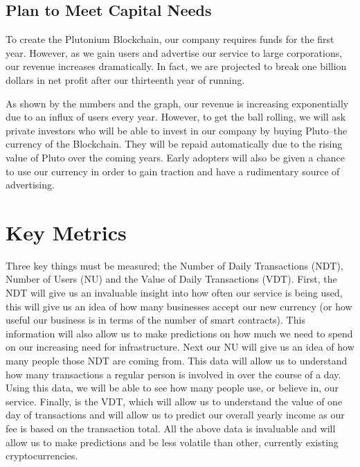 \documentclass[12pt]{article}
\begin{document}
\subsection{Plan to Meet Capital Needs}
To create the Plutonium Blockchain, our company requires funds for the first year. However, as we gain users and advertise our service to large corporations, our revenue increases dramatically. In fact, we are projected to break one billion dollars in net profit after our thirteenth year of running.

As shown by the numbers and the graph, our revenue is increasing exponentially due to an influx of users every year. However, to get the ball rolling, we will ask private investors who will be able to invest in our company by buying Pluto--the currency of the Blockchain. They will be repaid automatically due to the rising value of Pluto over the coming years. Early adopters will also be given a chance to use our currency in order to gain traction and have a rudimentary source of advertising.
\pagebreak
\section{Key Metrics}
Three key things must be measured; the Number of Daily Transactions (NDT), Number of
Users (NU) and the Value of Daily Transactions (VDT). First, the NDT will give us an
invaluable insight into how often our service is being used, this will give us an idea of how
many businesses accept our new currency (or how useful our business is in terms of the
number of smart contracts). This information will also allow us to make predictions on how
much we need to spend on our increasing need for infrastructure. Next our NU will give us
an idea of how many people those NDT are coming from. This data will allow us to
understand how many transactions a regular person is involved in over the course of a day.
Using this data, we will be able to see how many people use, or believe in, our service.
Finally, is the VDT, which will allow us to understand the value of one day of transactions
and will allow us to predict our overall yearly income as our fee is based on the transaction
total. All the above data is invaluable and will allow us to make predictions and be less
volatile than other, currently existing cryptocurrencies. 
\pagebreak
\end{document}
